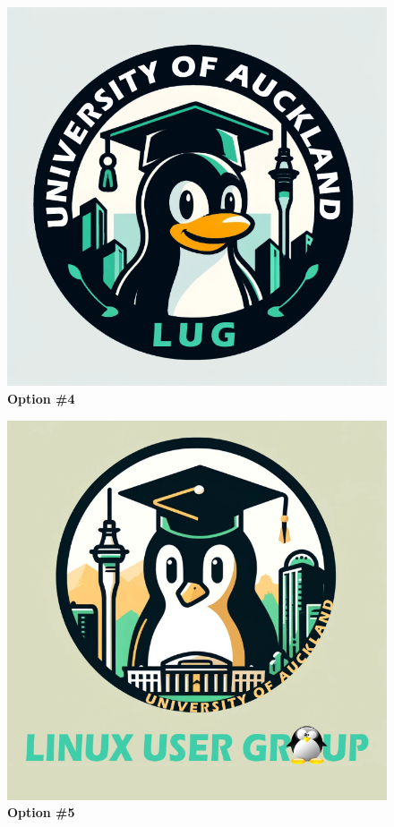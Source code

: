 \documentclass[11pt,fleqn]{article}
\begin{document}
\begin{figure}
  \centering
  \includegraphics[width=0.56\linewidth]{res/4.png}
  \caption*{\Large{\textbf{Option \#4}}}
  \label{fig:optn4}
\end{figure}

\begin{figure}
  \centering
  \includegraphics[width=0.56\linewidth]{res/5.png}
  \caption*{\Large{\textbf{Option \#5}}}
  \label{fig:optn5}
\end{figure}
\end{document}

